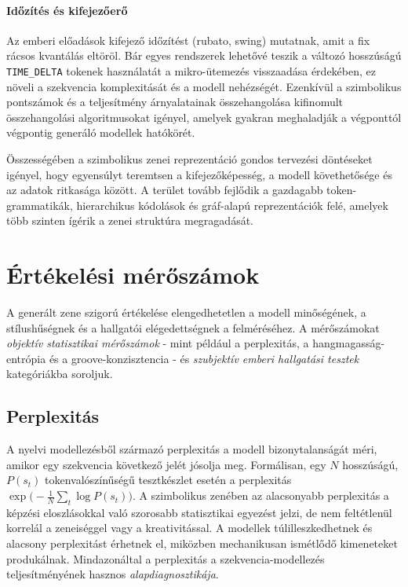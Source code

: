 \paragraph{Időzítés és kifejezőerő} Az emberi előadások kifejező időzítést (rubato, swing) mutatnak, amit a fix rácsos kvantálás eltöröl.  Bár egyes rendszerek lehetővé teszik a változó hosszúságú \texttt{TIME\_DELTA} tokenek használatát a mikro-ütemezés visszaadása érdekében, ez növeli a szekvencia komplexitását és a modell nehézségét. Ezenkívül a szimbolikus pontszámok és a teljesítmény árnyalatainak összehangolása kifinomult összehangolási algoritmusokat igényel, amelyek gyakran meghaladják a végponttól végpontig generáló modellek hatókörét.

Összességében a szimbolikus zenei reprezentáció gondos tervezési döntéseket igényel, hogy egyensúlyt teremtsen a kifejezőképesség, a modell követhetősége és az adatok ritkasága között.  A terület tovább fejlődik a gazdagabb token-grammatikák, hierarchikus kódolások és gráf-alapú reprezentációk felé, amelyek több szinten ígérik a zenei struktúra megragadását.

\newpage
\section{Értékelési mérőszámok}
A generált zene szigorú értékelése elengedhetetlen a modell minőségének, a stílushűségnek és a hallgatói elégedettségnek a felméréséhez.  A mérőszámokat \emph{objektív statisztikai mérőszámok} - mint például a perplexitás, a hangmagasság-entrópia és a groove-konzisztencia - és \emph{szubjektív emberi hallgatási tesztek} kategóriákba soroljuk.  

\subsection{Perplexitás}
A nyelvi modellezésből származó perplexitás a modell bizonytalanságát méri, amikor egy szekvencia következő jelét jósolja meg.  Formálisan, egy $N$ hosszúságú, $P(s_t)$ tokenvalószínűségű tesztkészlet esetén a perplexitás $\exp\bigl(-\frac{1}{N}\sum_t\log P(s_t)\bigr)$.  
A szimbolikus zenében az alacsonyabb perplexitás a képzési eloszlásokkal való szorosabb statisztikai egyezést jelzi, de nem feltétlenül korrelál a zeneiséggel vagy a kreativitással.  A modellek túlilleszkedhetnek és alacsony perplexitást érhetnek el, miközben mechanikusan ismétlődő kimeneteket produkálnak.  Mindazonáltal a perplexitás a szekvencia-modellezés teljesítményének hasznos \emph{alapdiagnosztikája}.

